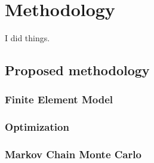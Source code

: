 \chapter{Methodology}
I did things.
\section{Proposed methodology}
	\subsection{Finite Element Model}
	
	\subsection{Optimization}
	\subsection{Markov Chain Monte Carlo}
	

